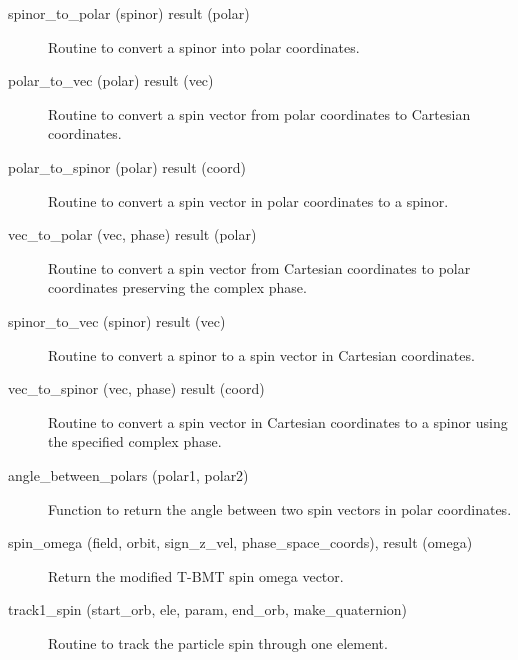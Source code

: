 \begin{description}

\label{r:spinor.to.polar}
\item[spinor_to_polar (spinor) result (polar)] \Newline 
Routine to convert a spinor into polar coordinates.

\label{r:polar.to.vec}
\item[polar_to_vec (polar) result (vec)] \Newline
Routine to convert a spin vector from polar coordinates to Cartesian coordinates.

\label{r:polar.to.spinor}
\item[polar_to_spinor (polar) result (coord)] \Newline
Routine to convert a spin vector in polar coordinates to a spinor.

\label{r:vec.to.polar}
\item[vec_to_polar (vec, phase) result (polar)] \Newline
Routine to convert a spin vector from Cartesian coordinates to polar coordinates 
preserving the complex phase.

\label{r:spinor.to.vec}
\item[spinor_to_vec (spinor) result (vec)] \Newline
Routine to convert a spinor to a spin vector in Cartesian coordinates.

\label{r:vec.to.spinor}
\item[vec_to_spinor (vec, phase) result (coord)] \Newline
Routine to convert a spin vector in Cartesian coordinates to a spinor using
the specified complex phase.

\label{r:angle.between.polars}
\item[angle_between_polars (polar1, polar2)] \Newline
Function to return the angle between two spin vectors in polar coordinates.

\label{r:spin.omega}
\item[spin_omega (field, orbit, sign_z_vel, phase_space_coords), result (omega)] \Newline 
Return the modified T-BMT spin omega vector.

\label{r:track1.spin}
\item[track1_spin (start_orb, ele, param, end_orb, make_quaternion)] \Newline
Routine to track the particle spin through one element.

\end{description}

